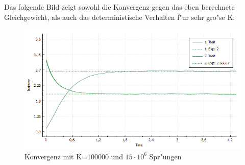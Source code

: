 \documentclass[11pt, a4paper, german]{article}
\theoremstyle{plain}
\begin{document}
		Das folgende Bild zeigt sowohl die Konvergenz gegen das eben berechnete Gleichgewicht, als auch das deterministische Verhalten f"ur sehr gro"se K:
		\begin{figure}[H]
			\centering
			\includegraphics[width=1\linewidth]{./Pictures/BigKInstance_Equillibrium}
			\caption[Konvergenz_K=100000]{Konvergenz mit K=100000 und $ 15\cdot10^6 $ Spr"ungen}
			\label{Konvergenz_K=100000}
		\end{figure}
	
\end{document}
